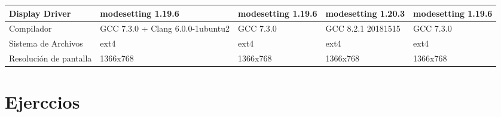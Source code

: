 \documentclass{article}
\begin{document}
\begin{table}
\begin{tabularx}{\linewidth}{|L|L|L|L|L|}
Display Driver         & modesetting 1.19.6                                     & modesetting 1.19.6                                          & modesetting 1.20.3                                                     & modesetting 1.19.6                                       \\ \hline
{}Compilador             & GCC 7.3.0 + Clang 6.0.0-1ubuntu2                       & GCC 7.3.0                                                   & GCC 8.2.1 20181515                                                     & GCC 7.3.0                                                \\ \hline
{}Sistema de Archivos    & ext4                                                   & ext4                                                        & ext4                                                                   & ext4                                                     \\ \hline
{}Resolución de pantalla & 1366x768                                               & 1366x768                                                    & 1366x768                                                               & 1366x768                                                 \\ \hline
\end{tabularx}
\end{table}


    \section{Ejerccios}
\end{document}
